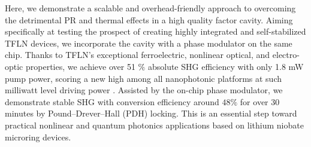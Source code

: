 \documentclass{WileyMSP-template}
\begin{document}

Here, we demonstrate a scalable and overhead-friendly approach to overcoming the detrimental PR and thermal effects in a high quality factor cavity. Aiming specifically at testing the prospect of creating highly integrated and self-stabilized TFLN devices, we incorporate the cavity with a phase modulator on the same chip. Thanks to TFLN's exceptional ferroelectric, nonlinear optical, and electro-optic properties, we achieve over 51 $\%$ absolute SHG efficiency with only 1.8 mW pump power, scoring a new high among all nanophotonic platforms at such milliwatt level driving power \cite{chen2019ultra, lu2019periodically, bruch2019chip, ma2020ultrabright, lu2019efficient, logan2018400, chang2019strong}. Assisted by the on-chip phase modulator, we demonstrate stable SHG with conversion efficiency around $48\%$ for over 30 minutes by Pound–Drever–Hall (PDH) locking. This is an essential step toward practical nonlinear and quantum photonics applications based on lithium niobate microring devices.


\end{document}

